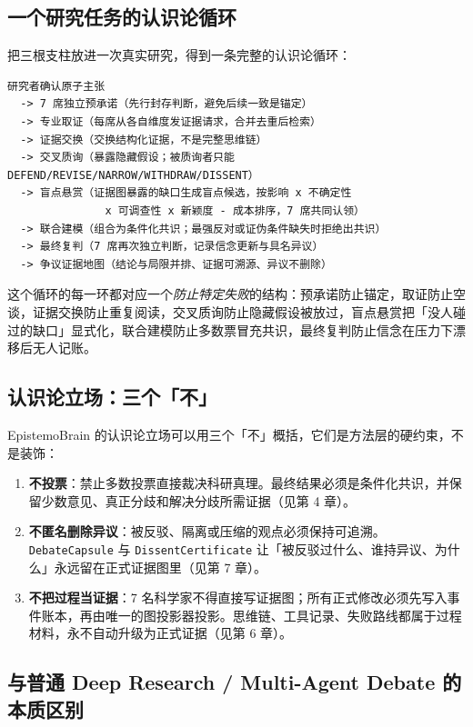 \subsection{一个研究任务的认识论循环}

把三根支柱放进一次真实研究，得到一条完整的认识论循环：

\begin{lstlisting}
研究者确认原子主张
  -> 7 席独立预承诺（先行封存判断，避免后续一致是锚定）
  -> 专业取证（每席从各自维度发证据请求，合并去重后检索）
  -> 证据交换（交换结构化证据，不是完整思维链）
  -> 交叉质询（暴露隐藏假设；被质询者只能 DEFEND/REVISE/NARROW/WITHDRAW/DISSENT）
  -> 盲点悬赏（证据图暴露的缺口生成盲点候选，按影响 x 不确定性
               x 可调查性 x 新颖度 - 成本排序，7 席共同认领）
  -> 联合建模（组合为条件化共识；最强反对或证伪条件缺失时拒绝出共识）
  -> 最终复判（7 席再次独立判断，记录信念更新与具名异议）
  -> 争议证据地图（结论与局限并排、证据可溯源、异议不删除）
\end{lstlisting}

这个循环的每一环都对应一个\emph{防止特定失败}的结构：预承诺防止锚定，取证防止空谈，证据交换防止重复阅读，交叉质询防止隐藏假设被放过，盲点悬赏把「没人碰过的缺口」显式化，联合建模防止多数票冒充共识，最终复判防止信念在压力下漂移后无人记账。

\subsection{认识论立场：三个「不」}

EpistemoBrain 的认识论立场可以用三个「不」概括，它们是方法层的硬约束，不是装饰：

\begin{enumerate}
\item \textbf{不投票}：禁止多数投票直接裁决科研真理。最终结果必须是条件化共识，并保留少数意见、真正分歧和解决分歧所需证据（见第 4 章）。
\item \textbf{不匿名删除异议}：被反驳、隔离或压缩的观点必须保持可追溯。\texttt{DebateCapsule} 与 \texttt{DissentCertificate} 让「被反驳过什么、谁持异议、为什么」永远留在正式证据图里（见第 7 章）。
\item \textbf{不把过程当证据}：7 名科学家不得直接写证据图；所有正式修改必须先写入事件账本，再由唯一的图投影器投影。思维链、工具记录、失败路线都属于过程材料，永不自动升级为正式证据（见第 6 章）。
\end{enumerate}

\subsection{与普通 Deep Research / Multi-Agent Debate 的本质区别}

